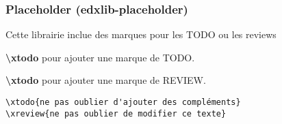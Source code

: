 \documentclass[a4paper,10pt,twocolumn]{article}
\begin{document}

\subsubsection{Placeholder (edxlib-placeholder)}	
Cette librairie inclue des marques pour les TODO ou les reviews

\textbf{\textbackslash xtodo} pour ajouter une marque de TODO.


\textbf{\textbackslash xtodo} pour ajouter une marque de REVIEW.
\begin{lstlisting}[style=LATEX]
\xtodo{ne pas oublier d'ajouter des compléments}
\xreview{ne pas oublier de modifier ce texte}
\end{lstlisting}
	
\end{document}
